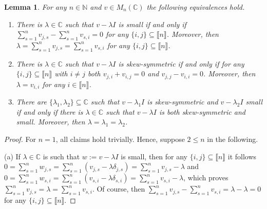\documentclass[10pt,a4paper]{amsart}
\numberwithin{equation}{section}
\newtheorem{Lemma}[Theorem]{Lemma}
\newcommand{\identitymatrix}{I}
\newcommand{\pint}{\mathbb{N}}
\newcommand{\comps}{\mathbb{C}}
\newcommand{\dwi}[1]{\llbracket{#1}\rrbracket}
\newcommand{\squarematrices}[2]{M_{#1}(#2)}
\newcommand{\kron}[2]{\delta_{#1,#2}}
\newcommand{\thedim}{n}
\begin{document}
{
  \newcommand{\themat}{v}
  \newcommand{\thematx}[2]{v_{#1,#2}}
  \newcommand{\indi}{i}
  \newcommand{\indj}{j}
  \newcommand{\inds}{s}
  \newcommand{\thesum}{\lambda}
  \newcommand{\firstsum}{\lambda_1}
  \newcommand{\secondsum}{\lambda_2}
\begin{Lemma}
  \label{lemma:small-skewsymmetric-both}
  For any $\thedim\in\pint$ and $\themat\in\squarematrices{\thedim}{\comps}$ the following equivalences hold.
  \begin{enumerate}
  \item\label{lemma:small-skewsymmetric-both-1} There is $\thesum\in\comps$ such that $\themat-\thesum\identitymatrix$ is small if and only if $\sum_{\inds=1}^\thedim\thematx{\indj}{\inds}-\sum_{\inds=1}^\thedim\thematx{\inds}{\indi}=0$ for any $\{\indi,\indj\}\subseteq \dwi{\thedim}$. Moreover, then $\thesum=\sum_{\inds=1}^\thedim\thematx{\indj}{\inds}=\sum_{\inds=1}^\thedim\thematx{\inds}{\indi}$ for any $\{\indi,\indj\}\subseteq \dwi{\thedim}$.
  \item\label{lemma:small-skewsymmetric-both-2} There is $\thesum\in\comps$ such that $\themat-\thesum\identitymatrix$ is skew-symmetric  if and only if for any $\{\indi,\indj\}\subseteq \dwi{\thedim}$ with $\indi\neq \indj$ both  $\thematx{\indj}{\indi}+\thematx{\indi}{\indj}=0$ and $\thematx{\indj}{\indj}-\thematx{\indi}{\indi}=0$.
    Moreover, then $\thesum=\thematx{\indi}{\indi}$ for any $\indi\in\dwi{\thedim}$.
  \item\label{lemma:small-skewsymmetric-both-3} There are $\{\firstsum,\secondsum\}\subseteq\comps$ such that $\themat-\firstsum\identitymatrix$ is skew-symmetric and $\themat-\secondsum\identitymatrix$  small if and only if there is $\thesum\in\comps$ such that $\themat-\thesum\identitymatrix$ is both skew-symmetric and small. Moreover, then $\thesum=\firstsum=\secondsum$.
  \end{enumerate}
\end{Lemma}
\begin{proof}
  \newcommand{\auxmat}{w}
  \newcommand{\auxmatx}[2]{w_{#1,#2}}
  For $\thedim=1$, all claims  hold trivially. Hence, suppose $2\leq \thedim$ in the following.

  (a)
  If $\thesum\in\comps$ is such that $\auxmat:=\themat-\thesum\identitymatrix$ is  small, then for any $\{\indi,\indj\}\subseteq\dwi{\thedim}$ it follows $0=\sum_{\inds=1}^\thedim\auxmatx{\indj}{\inds}=\sum_{\inds=1}^\thedim(\thematx{\indj}{\inds}-\thesum\kron{\indj}{\inds})=\sum_{\inds=1}^\thedim\thematx{\indj}{\inds}-\thesum$ and $0=\sum_{\inds=1}^\thedim\auxmatx{\inds}{\indi}=\sum_{\inds=1}^\thedim(\thematx{\inds}{\indi}-\thesum\kron{\inds}{\indi})=\sum_{\inds=1}^\thedim\thematx{\inds}{\indi}-\thesum$, which proves $\sum_{\inds=1}^\thedim\thematx{\indj}{\inds}=\thesum=\sum_{\inds=1}^\thedim\thematx{\inds}{\indi}$. Of course, then $\sum_{\inds=1}^\thedim\thematx{\indj}{\inds}-\sum_{\inds=1}^\thedim\thematx{\inds}{\indi}=\thesum-\thesum=0$ for any $\{\indi,\indj\}\subseteq \dwi{\thedim}$.


\end{proof}}
\end{document}
